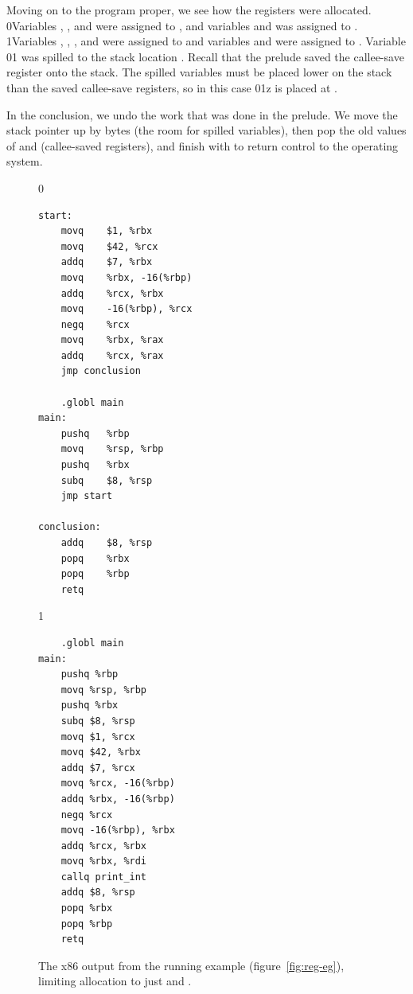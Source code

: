 \documentclass[7x10]{TimesAPriori_MIT}%
\def\racketEd{0}
\def\pythonEd{1}
\def\edition{1}
\newcommand{\racket}[1]{{\if\edition\racketEd{#1}\fi}}
\newcommand{\pythonColor}[0]{}
\newcommand{\python}[1]{{\if\edition\pythonEd\pythonColor #1\fi}}
\numberwithin{theorem}{chapter}
\numberwithin{definition}{chapter}
\numberwithin{equation}{chapter}
\begin{document}
Moving on to the program proper, we see how the registers were
allocated.
%
\racket{Variables , , and  were assigned to
  \code{rbx}, and variables  and \code{t} was assigned to .}
%
\python{Variables , , , and \code{tmp\_0}
  were assigned to \code{rcx} and variables \code{w} and \code{tmp\_1}
  were assigned to \code{rbx}.}
%
Variable \racket{}\python{} was spilled to the stack
location .  Recall that the prelude saved the
callee-save register  onto the stack. The spilled variables
must be placed lower on the stack than the saved callee-save
registers, so in this case \racket{}\python{z} is placed at
.

In the conclusion, we undo the work that was
done in the prelude. We move the stack pointer up by  bytes
(the room for spilled variables), then pop the old values of
 and  (callee-saved registers), and finish with
 to return control to the operating system.

  
\begin{figure}[tbp]
\begin{minipage}{0.55\textwidth}
\begin{tcolorbox}[colback=white]
{\if\edition\racketEd
\begin{lstlisting}
start:
	movq	$1, %rbx
	movq	$42, %rcx
	addq	$7, %rbx
	movq	%rbx, -16(%rbp)
	addq	%rcx, %rbx
	movq	-16(%rbp), %rcx
	negq	%rcx
	movq	%rbx, %rax
	addq	%rcx, %rax
	jmp conclusion

	.globl main
main:
	pushq	%rbp
	movq	%rsp, %rbp
	pushq	%rbx
	subq	$8, %rsp
	jmp start
        
conclusion:
	addq	$8, %rsp
	popq	%rbx
	popq	%rbp
	retq
\end{lstlisting}
\fi}
{\if\edition\pythonEd\pythonColor
\begin{lstlisting}
	.globl main
main:
	pushq %rbp
	movq %rsp, %rbp
	pushq %rbx
	subq $8, %rsp
	movq $1, %rcx
	movq $42, %rbx
	addq $7, %rcx
	movq %rcx, -16(%rbp)
	addq %rbx, -16(%rbp)
	negq %rcx
	movq -16(%rbp), %rbx
	addq %rcx, %rbx
	movq %rbx, %rdi
	callq print_int
	addq $8, %rsp
	popq %rbx
	popq %rbp
	retq
\end{lstlisting}
\fi}
\end{tcolorbox}
\end{minipage}
\caption{The x86 output from the running example
  (figure~\ref{fig:reg-eg}), limiting allocation to just 
  and .}
\label{fig:running-example-x86}
\end{figure}
\end{document}
